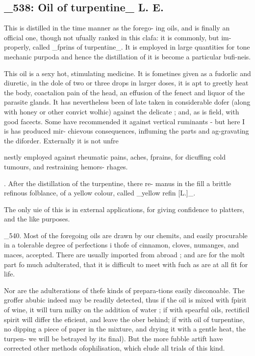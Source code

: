 \subsection*{\_538: Oil of turpentine\_ L. E.}
This is distilled in the time manner as the forego- ing oils, and is finally an official one, though not ufually ranked in this clafa: it is commonly, but im- properly, called \_fprins of turpentine\_. It is employed in large quantities for tone mechanic purpoda and hence the distillation of it is become a particular bufi-neis.\par\medskip
This oil is a sexy hot, stimulating medicine. It is fometines given as a fudorlic and diuretic, in the dole of two or three drops in larger doses, it is apt to greetly heat the body, coactalion pain of the head, an effusion of the fenect and liquor of the parasite glands. It has nevertheless been of late taken in considerable dofer (along with honey or other convict wolhic) against the delicate ; and, as is field, with good facects. Some have recommended it against vertical ruminants - but here I is has produced mir- chievous consequences, influming the parts and ag-gravating the diforder. Externally it is not unfre\par\medskip
nestly employed against rheumatic pains, aches, fprains, for dicuffing cold tumours, and restraining hemors- rhages.\par{}. After the distillation of the turpentine, there re- manus in the fill a brittle refinous folblance, of a yellow colour, called \_yellow refin [L.]\_.\par\medskip
The only uie of this is in external applications, for giving confidence to platters, and the like purposes.\par\medskip
\_540. Most of the foregoing oils are drawn by our chemits, and easily procurable in a tolerable degree of perfections i thofe of cinnamon, cloves, numanges, and maces, accepted. There are usually imported from abroad ; and are for the molt part fo much adulterated, that it is difficult to meet with fuch as are at all fit for life.\par\medskip
Nor are the adulterations of thefe kinds of prepara-tions easily disconoable. The groffer abubic indeed may be readily detected, thus if the oil is mixed with fpirit of wine, it will turn milky on the addition of water ; if with spearful oils, rectificil spirit will differ the eficient, and leave the ober behind; if with oil of turpentine, no dipping a piece of paper in the mixture, and drying it with a gentle heat, the turpen- we will be betrayed by its final). But the more fubble artift have corrected other methods ofophilisation, which elude all trials of this kind.\par\medskip
